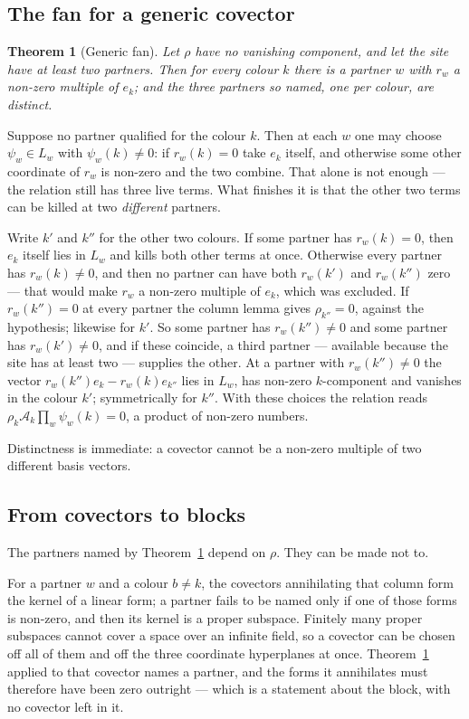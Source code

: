 \documentclass[11pt]{article}
\newtheorem{theorem}{Theorem}[section]
\theoremstyle{definition}
\theoremstyle{remark}
\begin{document}
\subsection*{The fan for a generic covector}

\begin{theorem}[Generic fan]\label{thm:rhofan}
Let $\rho$ have no vanishing component, and let the site have at least two partners. Then
for every colour $k$ there is a partner $w$ with $r_w$ a non-zero multiple of $e_k$; and
the three partners so named, one per colour, are distinct.
\end{theorem}

Suppose no partner qualified for the colour $k$. Then at each $w$ one may choose
$\psi_w \in L_w$ with $\psi_w(k) \neq 0$: if $r_w(k) = 0$ take $e_k$ itself, and otherwise
some other coordinate of $r_w$ is non-zero and the two combine. That alone is not enough
--- the relation still has three live terms. What finishes it is that the other two terms
can be killed at two \emph{different} partners.

Write $k'$ and $k''$ for the other two colours. If some partner has $r_w(k) = 0$, then
$e_k$ itself lies in $L_w$ and kills both other terms at once. Otherwise every partner has
$r_w(k) \neq 0$, and then no partner can have both $r_w(k')$ and $r_w(k'')$ zero --- that
would make $r_w$ a non-zero multiple of $e_k$, which was excluded. If $r_w(k'') = 0$ at
every partner the column lemma gives $\rho_{k''} = 0$, against the hypothesis; likewise
for $k'$. So some partner has $r_w(k'') \neq 0$ and some partner has $r_w(k') \neq 0$, and
if these coincide, a third partner --- available because the site has at least two ---
supplies the other. At a partner with $r_w(k'') \neq 0$ the vector
$r_w(k'')e_k - r_w(k)e_{k''}$ lies in $L_w$, has non-zero $k$-component and vanishes in
the colour $k'$; symmetrically for $k''$. With these choices the relation reads
$\rho_k \mathcal{A}_k \prod_w \psi_w(k) = 0$, a product of non-zero numbers.

Distinctness is immediate: a covector cannot be a non-zero multiple of two different basis
vectors.

\subsection*{From covectors to blocks}

The partners named by Theorem~\ref{thm:rhofan} depend on $\rho$. They can be made not to.

For a partner $w$ and a colour $b \neq k$, the covectors annihilating that column form
the kernel of a linear form; a partner fails to be named only if one of those forms is
non-zero, and then its kernel is a proper subspace. Finitely many proper subspaces cannot
cover a space over an infinite field, so a covector can be chosen off all of them and off
the three coordinate hyperplanes at once. Theorem~\ref{thm:rhofan} applied to that
covector names a partner, and the forms it annihilates must therefore have been zero
outright --- which is a statement about the block, with no covector left in it.
\end{document}
